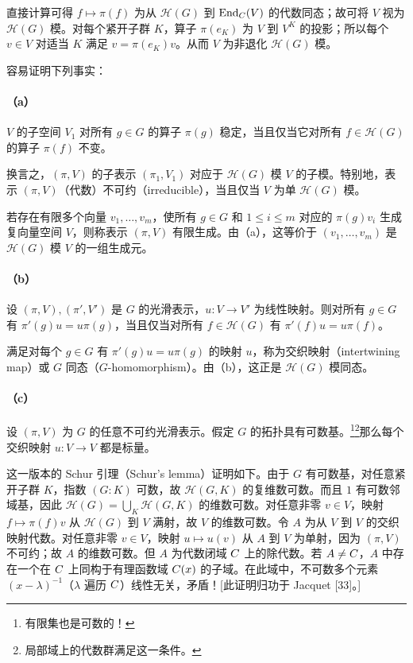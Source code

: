 直接计算可得 $f\mapsto\pi(f)$ 为从 $\mathcal H(G)$ 到 $\operatorname{End}_C(V)$ 的代数同态；故可将 $V$ 视为 $\mathcal H(G)$ 模。对每个紧开子群 $K$，算子 $\pi(e_K)$ 为 $V$ 到 $V^K$ 的投影；所以每个 $v\in V$ 对适当 $K$ 满足 $v=\pi(e_K)v$。从而 $V$ 为非退化 $\mathcal H(G)$ 模。

容易证明下列事实：
\paragraph*{（a）}
$V$ 的子空间 $V_1$ 对所有 $g\in G$ 的算子 $\pi(g)$ 稳定，当且仅当它对所有 $f\in\mathcal H(G)$ 的算子 $\pi(f)$ 不变。

换言之，$(\pi,V)$ 的子表示 $(\pi_1,V_1)$ 对应于 $\mathcal H(G)$ 模 $V$ 的子模。特别地，表示 $(\pi,V)$（代数）不可约（irreducible），当且仅当 $V$ 为单 $\mathcal H(G)$ 模。

若存在有限多个向量 $v_1,\ldots,v_m$，使所有 $g\in G$ 和 $1\leq i\leq m$ 对应的 $\pi(g)v_i$ 生成复向量空间 $V$，则称表示 $(\pi,V)$ 有限生成。由（a），这等价于 $(v_1,\ldots,v_m)$ 是 $\mathcal H(G)$ 模 $V$ 的一组生成元。
\paragraph*{（b）}
设 $(\pi,V),(\pi',V')$ 是 $G$ 的光滑表示，$u:V\to V'$ 为线性映射。则对所有 $g\in G$ 有 $\pi'(g)u=u\pi(g)$，当且仅当对所有 $f\in\mathcal H(G)$ 有 $\pi'(f)u=u\pi(f)$。

满足对每个 $g\in G$ 有 $\pi'(g)u=u\pi(g)$ 的映射 $u$，称为交织映射（intertwining map）或 $G$ 同态（$G$-homomorphism）。由（b），这正是 $\mathcal H(G)$ 模同态。
\paragraph*{（c）}
设 $(\pi,V)$ 为 $G$ 的任意不可约光滑表示。假定 $G$ 的拓扑具有可数基。\footnote{有限集也是可数的！}\footnote{局部域上的代数群满足这一条件。}那么每个交织映射 $u:V\to V$ 都是标量。

这一版本的 Schur 引理（Schur's lemma）证明如下。由于 $G$ 有可数基，对任意紧开子群 $K$，指数 $(G:K)$ 可数，故 $\mathcal H(G,K)$ 的复维数可数。而且 $1$ 有可数邻域基，因此 $\mathcal H(G)=\bigcup_K\mathcal H(G,K)$ 的维数可数。对任意非零 $v\in V$，映射 $f\mapsto\pi(f)v$ 从 $\mathcal H(G)$ 到 $V$ 满射，故 $V$ 的维数可数。令 $A$ 为从 $V$ 到 $V$ 的交织映射代数。对任意非零 $v\in V$，映射 $u\mapsto u(v)$ 从 $A$ 到 $V$ 为单射，因为 $(\pi,V)$ 不可约；故 $A$ 的维数可数。但 $A$ 为代数闭域 $C$ 上的除代数。若 $A\ne C$，$A$ 中存在一个在 $C$ 上同构于有理函数域 $C(x)$ 的子域。在此域中，不可数多个元素 $(x-\lambda)^{-1}$（$\lambda$ 遍历 $C$）线性无关，矛盾！[此证明归功于 Jacquet [33]。]

